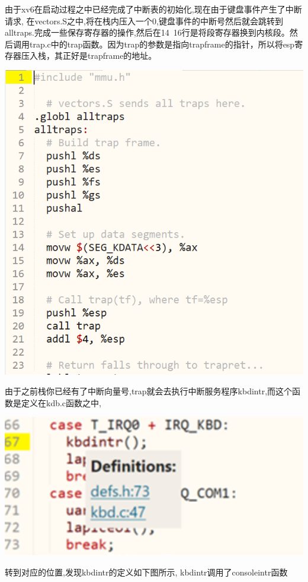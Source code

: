 由于xv6在启动过程之中已经完成了中断表的初始化,现在由于键盘事件产生了中断请求, 在vectors.S之中,将在栈内压入一个0,键盘事件的中断号然后就会跳转到alltraps.完成一些保存寄存器的操作,然后在14~16行是将段寄存器换到内核段。然后调用trap.c中的trap函数。因为trap的参数是指向trapframe的指针，所以将esp寄存器压入栈，其正好是trapframe的地址。

\includegraphics[width=6in]{figures/input/image7.png}

由于之前栈你已经有了中断向量号,trap就会去执行中断服务程序kbdintr,而这个函数是定义在kdb.c函数之中,

\includegraphics[width=6in]{figures/input/image8.png}

转到对应的位置,发现kbdintr的定义如下图所示, kbdintr调用了consoleintr函数

